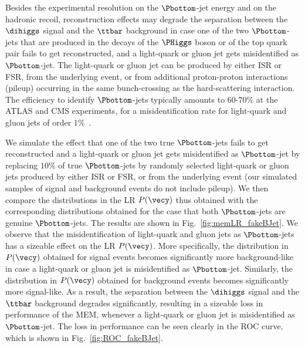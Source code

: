Besides the experimental resolution on the $\Pbottom$-jet energy and on the hadronic recoil,
reconstruction effects may degrade the separation between the $\dihiggs$ signal and the $\ttbar$ background
in case one of the two $\Pbottom$-jets that are produced in the decays of the $\PHiggs$ boson or of the top quark pair
fails to get reconstructed,
and a light-quark or gluon jet gets misidentified as $\Pbottom$-jet.
The light-quark or gluon jet can be produced by either ISR or FSR, from the underlying event, 
or from additional proton-proton interactions (pileup) occurring in the same bunch-crossing as the hard-scattering interaction.
The efficiency to identify $\Pbottom$-jets typically amounts to $60$-$70\%$ at the ATLAS and CMS experiments,
for a misidentification rate for light-quark and gluon jets of order $1\%$~\cite{Aad:2015ydr,BTV-16-002}.

We simulate the effect that one of the two true $\Pbottom$-jets fails to get reconstructed and a light-quark or gluon jet gets misidentified as $\Pbottom$-jet
by replacing $10\%$ of true $\Pbottom$-jets by randomly selected light-quark or gluon jets produced by either ISR or FSR, or from the underlying event 
(our simulated samples of signal and background events do not include pileup). 
We then compare the distributions in the LR $P(\vecy)$ thus obtained with the corresponding distributions obtained for the case that both $\Pbottom$-jets are genuine $\Pbottom$-jets.
The results are shown in Fig.~\ref{fig:memLR_fakeBJet}.
We observe that the misidentification of light-quark and gluon jets as $\Pbottom$-jets has a sizeable effect on the LR $P(\vecy)$.
More specifically, the distribution in $P(\vecy)$ obtained for signal events becomes significantly more background-like
in case a light-quark or gluon jet is misidentified as $\Pbottom$-jet.
Similarly, the distribution in $P(\vecy)$ obtained for background events becomes significantly more signal-like.
As a result, the separation between the $\dihiggs$ signal and the $\ttbar$ background degrades significantly,
resulting in a sizeable loss in performance of the MEM, whenever a light-quark or gluon jet is misidentified as $\Pbottom$-jet.
The loss in performance can be seen clearly in the ROC curve, which is shown in Fig.~\ref{fig:ROC_fakeBJet}.

